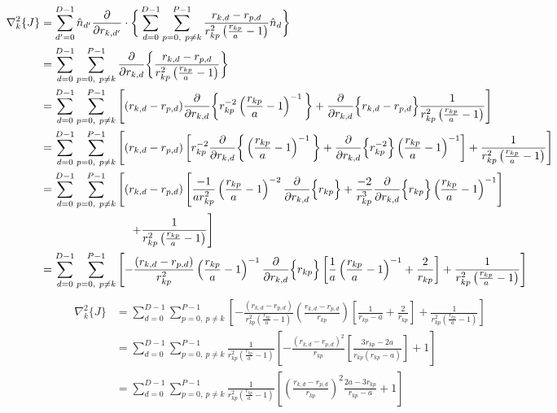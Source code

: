 \documentclass[12pt]{article}
\begin{document}
\begin{align*}
\nabla_k^2 \{ J \} &= \sum_{d'=0}^{D-1} \hat{n}_{d'} \frac{\partial}{\partial r_{k,d'}} \cdot \bigg\{ \sum_{d=0}^{D-1} \sum_{p=0, \ p\neq k}^{P-1} \frac{r_{k,d}-r_{p,d}}{r_{kp}^2 \left( \frac{r_{kp}}{a} -1 \right)} \hat{n}_d  \bigg\} \\
&= \sum_{d=0}^{D-1} \sum_{p=0, \ p\neq k}^{P-1} \frac{\partial}{\partial r_{k,d}} \bigg\{ \frac{r_{k,d}-r_{p,d}}{r_{kp}^2 \left( \frac{r_{kp}}{a} -1 \right)} \bigg\} \\
&= \sum_{d=0}^{D-1} \sum_{p=0, \ p\neq k}^{P-1} 
\left[ (r_{k,d}-r_{p,d})
\frac{\partial}{\partial r_{k,d}} \bigg\{ r_{kp}^{-2}\left( \frac{r_{kp}}{a} -1 \right)^{-1} \bigg\} + \frac{\partial}{\partial r_{k,d}} \Big\{ r_{k,d}-r_{p,d}  \Big\} \frac{1}{r_{kp}^2 \left( \frac{r_{kp}}{a} -1 \right)}
\right]\\
&= \sum_{d=0}^{D-1} \sum_{p=0, \ p\neq k}^{P-1} 
\left[ (r_{k,d}-r_{p,d})
\left[ r_{kp}^{-2} \frac{\partial}{\partial r_{k,d}} \bigg\{ \left( \frac{r_{kp}}{a} -1 \right)^{-1} \bigg\} + \frac{\partial}{\partial r_{k,d}} \Big\{ r_{kp}^{-2} \Big\} \left( \frac{r_{kp}}{a} -1 \right)^{-1} \right]
 + \frac{1}{r_{kp}^2 \left( \frac{r_{kp}}{a} -1 \right)}
\right]\\
&= \sum_{d=0}^{D-1} \sum_{p=0, \ p\neq k}^{P-1} 
\left[ (r_{k,d}-r_{p,d})
\left[ 
\frac{-1}{a r_{kp}^2} \left( \frac{r_{kp}}{a} -1 \right)^{-2}
 \frac{\partial}{\partial r_{k,d}} \Big\{ r_{kp} \Big\} 
+ \frac{-2}{r_{kp}^3}  \frac{\partial}{\partial r_{k,d}} \Big\{ r_{kp} \Big\} \left( \frac{r_{kp}}{a} -1 \right)^{-1} 
\right] \right. \\
& \hspace*{2.75cm}  \left.
 + \frac{1}{r_{kp}^2 \left( \frac{r_{kp}}{a} -1 \right)}
\right]\\
&= \sum_{d=0}^{D-1} \sum_{p=0, \ p\neq k}^{P-1} 
\left[ -\frac{(r_{k,d}-r_{p,d})}{r_{kp}^2} \left( \frac{r_{kp}}{a} -1 \right)^{-1}  \frac{\partial}{\partial r_{k,d}} \Big\{ r_{kp} \Big\}
\left[ 
\frac{1}{a} \left( \frac{r_{kp}}{a} -1 \right)^{-1} 
+ \frac{2}{r_{kp}}
\right] 
+ \frac{1}{r_{kp}^2 \left( \frac{r_{kp}}{a} -1 \right)}
\right]
\end{align*}
\begin{align*}
\nabla_k^2\{ J \} 
&= \sum_{d=0}^{D-1} \sum_{p=0, \ p\neq k}^{P-1} 
\left[ -\frac{(r_{k,d}-r_{p,d})}{r_{kp}^2 \left( \frac{r_{kp}}{a} -1 \right)}  \left( \frac{r_{k,d}-r_{p,d}}{r_{kp}} \right)
\left[ 
\frac{1}{r_{kp}-a}
+ \frac{2}{r_{kp}}
\right] 
+ \frac{1}{r_{kp}^2 \left( \frac{r_{kp}}{a} -1 \right)}
\right]\\
&= \sum_{d=0}^{D-1} \sum_{p=0, \ p\neq k}^{P-1}  \frac{1}{r_{kp}^2 \left( \frac{r_{kp}}{a} -1 \right)}
\left[ 
-\frac{(r_{k,d}-r_{p,d})^2}{r_{kp}} \left[ \frac{3r_{kp}-2a}{r_{kp}(r_{kp}-a)} \right] +1
\right]\\
&= \sum_{d=0}^{D-1} \sum_{p=0, \ p\neq k}^{P-1}  \frac{1}{r_{kp}^2 \left( \frac{r_{kp}}{a} -1 \right)}
\left[ 
\left( \frac{r_{k,d}-r_{p,d}}{r_{kp}} \right)^2 \frac{2a-3r_{kp}}{r_{kp}-a}
 +1
\right]\\
\end{align*}
\end{document}
